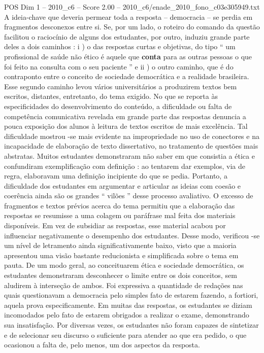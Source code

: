 \begin{textsample}{POS Dim 1 – 2010\_c6 – Score 2.00 – 2010\_c6/enade\_2010\_fono\_c03e305949.txt}
A ideia-chave que deveria permear toda a resposta – democracia – se perdia em fragmentos desconexos entre si.
Se, por um lado, o roteiro do comando da questão facilitou o raciocínio de alguns dos estudantes, por outro, induziu grande parte deles a dois caminhos : i ) o das respostas curtas e objetivas, do tipo “ um profissional de saúde não ético é aquele que \textbf{conta} para as outras pessoas o que foi feito na consulta com o seu paciente ” e ii ) o outro caminho, que é do contraponto entre o conceito de sociedade democrática e a realidade brasileira.
Esse segundo caminho levou vários universitários a produzirem textos bem escritos, distantes, entretanto, do tema exigido.
No que se reporta às especificidades do desenvolvimento do conteúdo, a dificuldade ou falta de competência comunicativa revelada em grande parte das respostas denuncia a pouca exposição dos alunos à leitura de textos escritos de mais excelência.
Tal dificuldade mostrou -se mais evidente na impropriedade no uso de conectores e na incapacidade de elaboração de texto dissertativo, no tratamento de questões mais abstratas.
Muitos estudantes demonstraram não saber em que consistia a ética e confundiram exemplificação com definição : ao tentarem dar exemplos, via de regra, elaboravam uma definição incipiente do que se pedia.
Portanto, a dificuldade dos estudantes em argumentar e articular as ideias com coesão e coerência ainda são os grandes “ vilões ” desse processo avaliativo.
O excesso de fragmentos e textos prévios acerca do tema permitiu que a elaboração das respostas se resumisse a uma colagem ou paráfrase mal feita dos materiais disponíveis.
Em vez de subsidiar as respostas, esse material acabou por influenciar negativamente o desempenho dos estudantes.
Desse modo, verificou -se um nível de letramento ainda significativamente baixo, visto que a maioria apresentou uma visão bastante reducionista e simplificada sobre o tema em pauta.
De um modo geral, ao conceituarem ética e sociedade democrática, os estudantes demonstraram desconhecer o limite entre os dois conceitos, sem aludirem à interseção de ambos.
Foi expressiva a quantidade de redações nas quais questionavam a democracia pelo simples fato de estarem fazendo, a fortiori, aquela prova especificamente.
Em muitas das respostas, os estudantes se diziam incomodados pelo fato de estarem obrigados a realizar o exame, demonstrando sua insatisfação.
Por diversas vezes, os estudantes não foram capazes de sintetizar e de selecionar seu discurso o suficiente para atender ao que era pedido, o que ocasionou a falta de, pelo menos, um dos aspectos da resposta.

\end{textsample}
